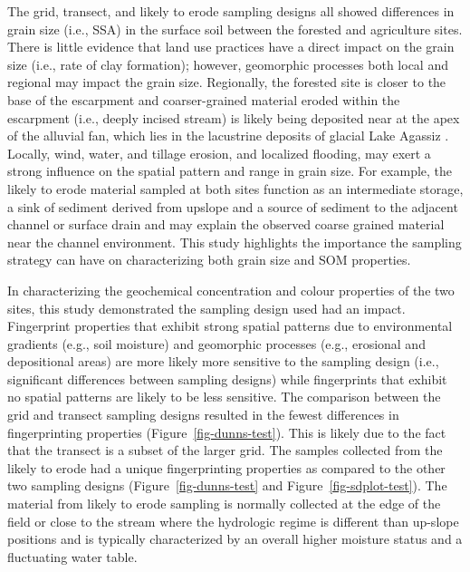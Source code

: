 \documentclass[
  number]{elsarticle}
\begin{document}
The grid, transect, and likely to erode sampling designs all showed
differences in grain size (i.e., SSA) in the surface soil between the
forested and agriculture sites. There is little evidence that land use
practices have a direct impact on the grain size (i.e., rate of clay
formation); however, geomorphic processes both local and regional may
impact the grain size. Regionally, the forested site is closer to the
base of the escarpment and coarser-grained material eroded within the
escarpment (i.e., deeply incised stream) is likely being deposited near
at the apex of the alluvial fan, which lies in the lacustrine deposits
of glacial Lake Agassiz \citep{mcginn1979}. Locally, wind, water, and
tillage erosion, and localized flooding, may exert a strong influence on
the spatial pattern and range in grain size. For example, the likely to
erode material sampled at both sites function as an intermediate
storage, a sink of sediment derived from upslope and a source of
sediment to the adjacent channel or surface drain and may explain the
observed coarse grained material near the channel environment. This
study highlights the importance the sampling strategy can have on
characterizing both grain size and SOM properties.

In characterizing the geochemical concentration and colour properties of
the two sites, this study demonstrated the sampling design used had an
impact. Fingerprint properties that exhibit strong spatial patterns due
to environmental gradients (e.g., soil moisture) and geomorphic
processes (e.g., erosional and depositional areas)
\citep{hoffmann2009, borch2010} are more likely more sensitive to the
sampling design (i.e., significant differences between sampling designs)
while fingerprints that exhibit no spatial patterns are likely to be
less sensitive. The comparison between the grid and transect sampling
designs resulted in the fewest differences in fingerprinting properties
(Figure~\ref{fig-dunns-test}). This is likely due to the fact that the
transect is a subset of the larger grid. The samples collected from the
likely to erode had a unique fingerprinting properties as compared to
the other two sampling designs (Figure~\ref{fig-dunns-test} and
Figure~\ref{fig-sdplot-test}). The material from likely to erode
sampling is normally collected at the edge of the field or close to the
stream where the hydrologic regime is different than up-slope positions
and is typically characterized by an overall higher moisture status and
a fluctuating water table.
\end{document}
